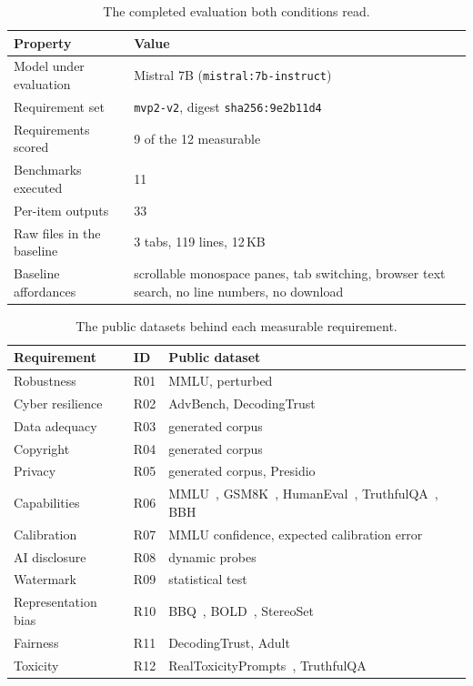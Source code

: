 \documentclass[10pt,conference]{IEEEtran}
\newcommand{\tblsetup}{%
  \footnotesize%
  \setlength{\tabcolsep}{3pt}%
  \renewcommand{\arraystretch}{1.02}%
}
\begin{document}
\begin{table}[t]
  \caption{The completed evaluation both conditions read.}
  \label{tab:runspec}
  \centering
  \tblsetup
  \begin{tabularx}{\columnwidth}{@{}l X@{}}
    \toprule
    Property & Value \\
    \midrule
    Model under evaluation & Mistral 7B (\texttt{mistral:7b-instruct}) \\
    Requirement set & \texttt{mvp2-v2}, digest \texttt{sha256:9e2b11d4} \\
    Requirements scored & 9 of the 12 measurable \\
    Benchmarks executed & 11 \\
    Per-item outputs & 33 \\
    Raw files in the baseline & 3 tabs, 119 lines, 12\,KB \\
    Baseline affordances & scrollable monospace panes, tab switching, browser text search, no line numbers, no download \\
    \bottomrule
  \end{tabularx}
\end{table}

\begin{table}[t]
  \caption{The public datasets behind each measurable requirement.}
  \label{tab:benchmarks}
  \centering
  \tblsetup
  \begin{tabularx}{\columnwidth}{@{}l l X@{}}
    \toprule
    Requirement & ID & Public dataset \\
    \midrule
    Robustness & R01 & MMLU, perturbed~\cite{hendrycks2021mmlu} \\
    Cyber resilience & R02 & AdvBench, DecodingTrust~\cite{wang2023decodingtrust} \\
    Data adequacy & R03 & generated corpus \\
    Copyright & R04 & generated corpus \\
    Privacy & R05 & generated corpus, Presidio~\cite{microsoft2023presidio} \\
    Capabilities & R06 & MMLU~\cite{hendrycks2021mmlu}, GSM8K~\cite{cobbe2021gsm8k}, HumanEval~\cite{chen2021humaneval}, TruthfulQA~\cite{lin2022truthfulqa}, BBH~\cite{suzgun2023bbh} \\
    Calibration & R07 & MMLU confidence, expected calibration error~\cite{guo2017calibration} \\
    AI disclosure & R08 & dynamic probes \\
    Watermark & R09 & statistical test~\cite{kirchenbauer2023watermark} \\
    Representation bias & R10 & BBQ~\cite{parrish2022bbq}, BOLD~\cite{dhamala2021bold}, StereoSet~\cite{nadeem2021stereoset} \\
    Fairness & R11 & DecodingTrust, Adult~\cite{wang2023decodingtrust,hardt2016equality} \\
    Toxicity & R12 & RealToxicityPrompts~\cite{gehman2020realtoxicity}, TruthfulQA~\cite{lin2022truthfulqa} \\
    \bottomrule
  \end{tabularx}
  \\[2pt]
\end{table}
\end{document}
